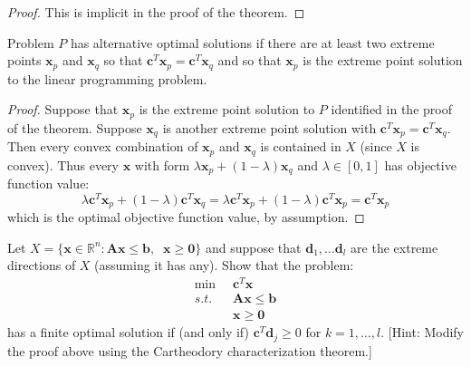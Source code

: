 \begin{proof} This is implicit in the proof of the theorem.
\end{proof}
\begin{corollary} Problem $P$ has alternative optimal solutions if there are at least two extreme points $\mathbf{x}_p$ and $\mathbf{x}_q$ so that $\mathbf{c}^T\mathbf{x}_p = \mathbf{c}^T\mathbf{x}_q$ and so that $\mathbf{x}_p$ is the extreme point solution to the linear programming problem.
\end{corollary}
\begin{proof} Suppose that $\mathbf{x}_p$ is the extreme point solution to $P$ identified in the proof of the theorem. Suppose $\mathbf{x}_q$ is another extreme point solution with $\mathbf{c}^T\mathbf{x}_p = \mathbf{c}^T\mathbf{x}_q$. Then every convex combination of $\mathbf{x}_p$ and $\mathbf{x}_q$ is contained in $X$ (since $X$ is convex). Thus every $\mathbf{x}$ with form $\lambda\mathbf{x}_p + (1-\lambda)\mathbf{x}_q$ and $\lambda \in [0,1]$ has objective function value:
\begin{displaymath}
\lambda\mathbf{c}^T\mathbf{x}_p + (1-\lambda)\mathbf{c}^T\mathbf{x}_q = 
\lambda\mathbf{c}^T\mathbf{x}_p + (1-\lambda)\mathbf{c}^T\mathbf{x}_p = 
\mathbf{c}^T\mathbf{x}_p
\end{displaymath}
which is the optimal objective function value, by assumption.
\end{proof}

\begin{exercise} Let $X = \{\mathbf{x} \in \mathbb{R}^n : \mathbf{A}\mathbf{x} \leq \mathbf{b},\;\;\mathbf{x} \geq \mathbf{0}\}$ and suppose that $\mathbf{d}_1,\dots\mathbf{d}_l$ are the extreme directions of $X$ (assuming it has any). Show that the problem:
\begin{equation}
\begin{aligned}
\min\;\;&\mathbf{c}^T\mathbf{x}\\
s.t.\;\;&\mathbf{A}\mathbf{x} \leq \mathbf{b}\\
& \mathbf{x} \geq \mathbf{0}
\end{aligned}
\end{equation}
has a finite optimal solution if (and only if) $\mathbf{c}^T\mathbf{d}_j \geq 0$ for $k=1,\dots,l$. [Hint: Modify the proof above using the Cartheodory characterization theorem.] 
\label{exer:MinDirections}
\end{exercise}

